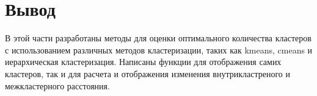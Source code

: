 \section*{Вывод}

В этой части разработаны методы для оценки оптимального количества кластеров с использованием различных методов кластеризации, 
таких как kmeans, cmeans и иерархическая кластеризация. Написаны функции для отображения самих кластеров, так и для расчета и отображения изменения
внутрикластреного и межкластерного расстояния. 

\clearpage
